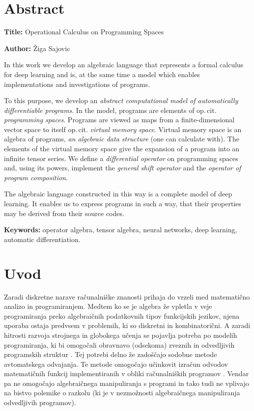 \documentclass[a4paper, 12pt]{book}
\newcommand{\ttitleEn}{Operational Calculus on Programming Spaces}
\newcommand{\tauthor}{Žiga Sajovic}
\newcommand{\tkeywordsEn}{operator algebra, tensor algebra, neural networks, deep learning, automatic differentiation}
\newcommand{\clearemptydoublepage}{\newpage{\pagestyle{empty}\cleardoublepage}}
\begin{document}
\chapter*{Abstract}

\noindent\textbf{Title:} \ttitleEn
\bigskip

\noindent\textbf{Author:} \tauthor
\bigskip

\noindent 
In this work we develop an algebraic language that represents a formal calculus for deep learning and is, at the same time a model which enables implementations and investigations of programs.

To this purpose, we develop an \emph{abstract computational model of automatically differentiable programs}. In the model, programs are elements of op.\,cit. \emph{programming spaces}. Programs are viewed as maps from a finite-dimensional vector space to itself op.\,cit. \emph{virtual memory space}. Virtual memory space is an algebra of programs, \emph{an algebraic data structure} (one can calculate with). The elements of the virtual memory space give the expansion of a program into an infinite tensor series. We define a \emph{differential operator} on programming spaces and, using its powers, implement the \emph{general shift operator} and the \emph{operator of program composition}.

The algebraic language constructed in this way is a complete model of deep learning. It enables us to express programs in such a way, that their properties may be derived from their source codes.

\bigskip

\noindent\textbf{Keywords:} \tkeywordsEn.
\clearemptydoublepage

\mainmatter
\setcounter{page}{1}
\pagestyle{fancy}

\chapter{Uvod}

Zaradi diskretne narave računalniške znanosti prihaja do vrzeli med matematično analizo in programiranjem. Medtem ko se je algebra že vpletla v veje programiranja preko algebraičnih podatkovnih tipov funkcijskih jezikov, njena uporaba ostaja predvsem v problemih, ki so diskretni in kombinatorični. A zaradi hitrosti razvoja strojnega in globokega učenja se pojavlja potreba po modelih programiranja, ki bi omogočali obravnavo (odsekoma) zveznih in odvedljivih programskih struktur \cite{AdSurvey}. Tej potrebi delno že zadoščajo sodobne metode avtomatskega odvajanja. Te metode omogočajo učinkovit izračun odvodov matematičnih funkcij implementiranih v obliki računalniških programov \cite{AD1}. Vendar pa ne omogočajo algebraičnega manipuliranja s programi in tako tudi ne vplivajo na bistvo polemike o razkolu (ki je v nezmožnosti algebraičnega manipuliranja odvedljivih programov).
\end{document}
